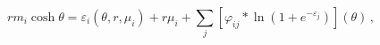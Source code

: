\begin{equation}
rm_{i}\cosh \theta =\varepsilon _{i}(\theta ,r,\mu _{i})+r\mu
_{i}+\sum\limits_{j}[\varphi _{ij}\ast \ln (1+e^{-\varepsilon _{j}})](\theta
)\,,  \label{TBA}
\end{equation}%
